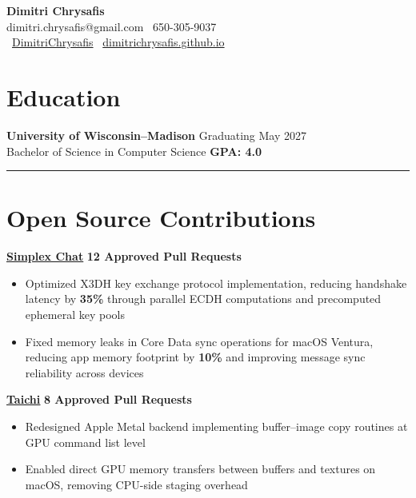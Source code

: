 \documentclass[11pt]{article}
\begin{document}
\begin{center}
\textbf{\Large Dimitri Chrysafis}\\[2pt]
dimitri.chrysafis@gmail.com \textbullet \ 650-305-9037\\
\faGithub \ \href{https://github.com/DimitriChrysafis}{DimitriChrysafis} \textbullet \ \href{https://dimitrichrysafis.github.io/}{dimitrichrysafis.github.io}
\end{center}

\vspace{4pt}

\section*{\textcolor{modernblue}{\Large Education}}
\textbf{University of Wisconsin–Madison} \hfill Graduating May 2027\\
Bachelor of Science in Computer Science \hfill \textcolor{accentgreen}{\textbf{GPA: 4.0}}

\noindent\rule{\textwidth}{0.5pt}

\section*{\textcolor{modernblue}{\Large Open Source Contributions}}
\textbf{\href{https://simplex.chat/}{\underline{Simplex Chat}}} \hfill \textcolor{modernblue}{\textbf{12 Approved Pull Requests}}
\begin{itemize}[leftmargin=*, topsep=0pt, itemsep=0pt, parsep=0pt]
\item Optimized X3DH key exchange protocol implementation, reducing handshake latency by \textbf{35\%} through parallel ECDH computations and precomputed ephemeral key pools
\item Fixed memory leaks in Core Data sync operations for macOS Ventura, reducing app memory footprint by \textbf{10\%} and improving message sync reliability across devices
\end{itemize}
\vspace{1pt}
\noindent\textbf{\href{https://www.taichi-lang.org/}{\underline{Taichi}}} \hfill \textcolor{modernblue}{\textbf{8 Approved Pull Requests}}
\begin{itemize}[leftmargin=*, topsep=0pt, itemsep=0pt, parsep=0pt]
\item Redesigned Apple Metal backend implementing buffer–image copy routines at GPU command list level
\item Enabled direct GPU memory transfers between buffers and textures on macOS, removing CPU-side staging overhead
\end{itemize}
\end{document}

